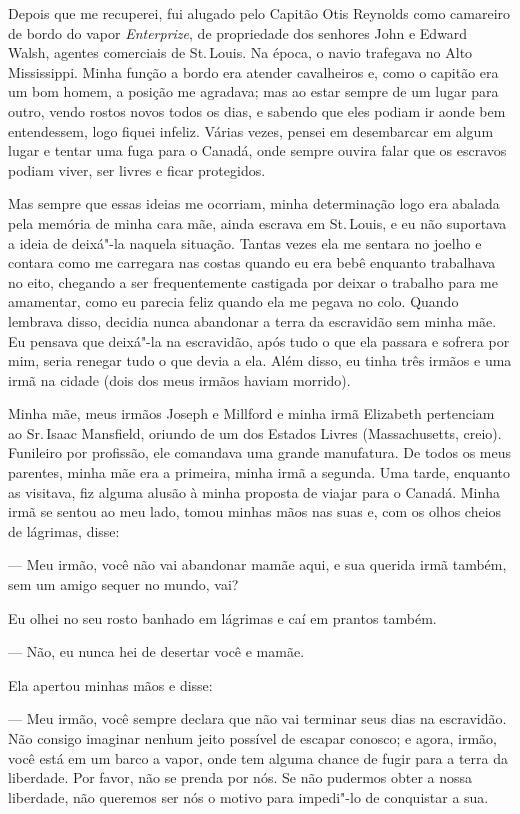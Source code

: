 Depois que me recuperei, fui alugado pelo Capitão Otis Reynolds como
camareiro de bordo do vapor \emph{Enterprize}, de propriedade dos
senhores John e Edward Walsh, agentes comerciais de St.\,Louis. Na época,
o navio trafegava no Alto Mississippi. Minha função a bordo era atender
cavalheiros e, como o capitão era um bom homem, a posição me agradava;
mas ao estar sempre de um lugar para outro, vendo rostos novos todos os
dias, e sabendo que eles podiam ir aonde bem entendessem, logo fiquei
infeliz. Várias vezes, pensei em desembarcar em algum lugar e tentar uma
fuga para o Canadá, onde sempre ouvira falar que os escravos podiam
viver, ser livres e ficar protegidos.

Mas sempre que essas ideias me ocorriam, minha determinação logo era
abalada pela memória de minha cara mãe, ainda escrava em St.\,Louis, e eu
não suportava a ideia de deixá"-la naquela situação. Tantas vezes ela me
sentara no joelho e contara como me carregara nas costas quando eu era
bebê enquanto trabalhava no eito, chegando a ser frequentemente
castigada por deixar o trabalho para me amamentar, como eu parecia feliz
quando ela me pegava no colo. Quando lembrava disso, decidia nunca
abandonar a terra da escravidão sem minha mãe. Eu pensava que deixá"-la
na escravidão, após tudo o que ela passara e sofrera por mim, seria
renegar tudo o que devia a ela. Além disso, eu tinha três irmãos e uma
irmã na cidade (dois dos meus irmãos haviam morrido).

Minha mãe, meus irmãos Joseph e Millford e minha irmã Elizabeth
pertenciam ao Sr.\,Isaac Mansfield, oriundo de um dos Estados Livres
(Massachusetts, creio). Funileiro por profissão, ele comandava uma
grande manufatura. De todos os meus parentes, minha mãe era a primeira,
minha irmã a segunda. Uma tarde, enquanto as visitava, fiz alguma alusão
à minha proposta de viajar para o Canadá. Minha irmã se sentou ao meu
lado, tomou minhas mãos nas suas e, com os olhos cheios de lágrimas,
disse:

--- Meu irmão, você não vai abandonar mamãe aqui, e sua querida irmã
também, sem um amigo sequer no mundo, vai?

Eu olhei no seu rosto banhado em lágrimas e caí em prantos também.

--- Não, eu nunca hei de desertar você e mamãe.

Ela apertou minhas mãos e disse:

--- Meu irmão, você sempre declara que não vai terminar seus dias na
escravidão. Não consigo imaginar nenhum jeito possível de escapar
conosco; e agora, irmão, você está em um barco a vapor, onde tem alguma chance
de fugir para a terra da liberdade. Por favor, não se prenda por nós. Se
não pudermos obter a nossa liberdade, não queremos ser nós o motivo para
impedi"-lo de conquistar a sua.

